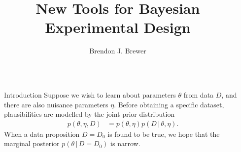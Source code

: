 \documentclass[final,hyperref={pdfpagelabels=false}]{beamer}
\title{\huge New Tools for Bayesian Experimental Design} %
\author{Brendon J. Brewer} %
\institute{Department of Statistics, The University of Auckland} %
\newcommand{\given}{\,|\,}
\begin{document}

\begin{frame}[t] %

\begin{columns}[t] %

\begin{column}{.02\textwidth}\end{column} %

\begin{column}{.465\textwidth} %





            
\begin{block}{Introduction}
Suppose we wish to learn about parameters $\theta$ from data $D$, and there
are also nuisance parameters $\eta$.
Before obtaining a specific dataset, plausibilities are modelled by the
joint prior distribution
\begin{align}
p(\theta, \eta, D) &= p(\theta, \eta)p(D \given \theta, \eta).
\end{align}
When a data proposition $D=D_0$ is found to be true, we hope that the
marginal posterior $p(\theta \given D = D_0)$ is narrow.


\end{block}
\end{column}
\end{columns}
\end{frame}
\end{document}
